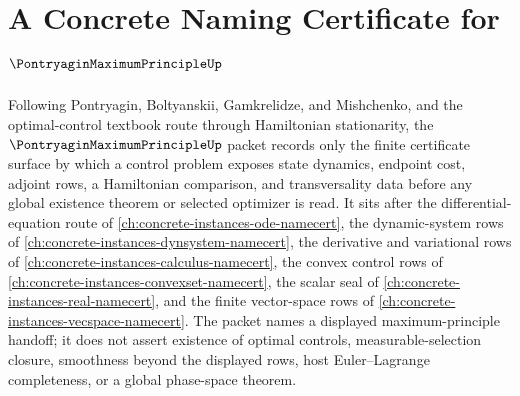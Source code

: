 \chapter{A Concrete Naming Certificate for $\PontryaginMaximumPrincipleUp$}
\label{ch:concrete-instances-pontryagin-maximum-principle-namecert}

Following Pontryagin, Boltyanskii, Gamkrelidze, and Mishchenko, and the optimal-control textbook route through Hamiltonian stationarity, the $\PontryaginMaximumPrincipleUp$ packet records only the finite certificate surface by which a control problem exposes state dynamics, endpoint cost, adjoint rows, a Hamiltonian comparison, and transversality data before any global existence theorem or selected optimizer is read. It sits after the differential-equation route of \autoref{ch:concrete-instances-ode-namecert}, the dynamic-system rows of \autoref{ch:concrete-instances-dynsystem-namecert}, the derivative and variational rows of \autoref{ch:concrete-instances-calculus-namecert}, the convex control rows of \autoref{ch:concrete-instances-convexset-namecert}, the scalar seal of \autoref{ch:concrete-instances-real-namecert}, and the finite vector-space rows of \autoref{ch:concrete-instances-vecspace-namecert}. The packet names a displayed maximum-principle handoff; it does not assert existence of optimal controls, measurable-selection closure, smoothness beyond the displayed rows, host Euler--Lagrange completeness, or a global phase-space theorem.

